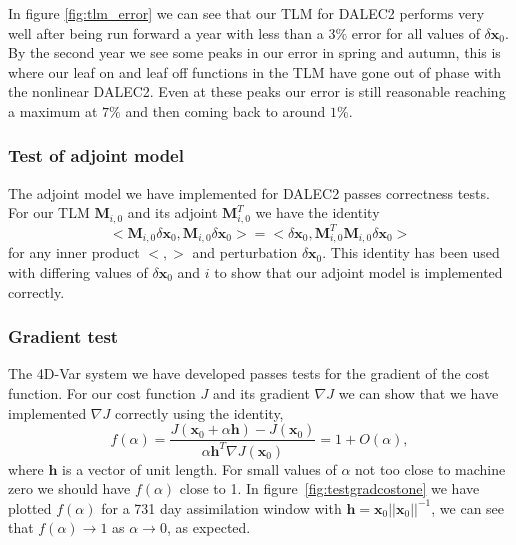 \documentclass[11pt]{article}
\begin{document}
In figure \ref{fig:tlm_error} we can see that our TLM for DALEC2 performs very well after being run forward a year with less than a $3\%$ error for all values of $\delta \textbf{x}_0$. By the second year we see some peaks in our error in spring and autumn, this is where our leaf on and leaf off functions in the TLM have gone out of phase with the nonlinear DALEC2. Even at these peaks our error is still reasonable reaching a maximum at $7\%$ and then coming back to around $1\%$. 

\subsubsection{Test of adjoint model} 

The adjoint model we have implemented for DALEC2 passes correctness tests. For our TLM $\mathbf{M}_{i,0}$ and its adjoint $\mathbf{M}_{i,0}^{T}$ we have the identity
\begin{equation}
<\mathbf{M}_{i,0}\delta\textbf{x}_0, \mathbf{M}_{i,0}\delta\textbf{x}_0> = <\delta\textbf{x}_0, \mathbf{M}_{i,0}^{T}\mathbf{M}_{i,0}\delta\textbf{x}_0>
\end{equation}
for any inner product $<, >$ and perturbation $\delta \textbf{x}_0$. This identity has been used with differing values of $\delta \textbf{x}_0$ and $i$ to show that our adjoint model is implemented correctly.

\subsubsection{Gradient test} \label{sec:testgrad}

The 4D-Var system we have developed passes tests for the gradient of the cost function. For our cost function $J$ and its gradient $\nabla J$ we can show that we have implemented $\nabla J$ correctly using the identity,
\begin{equation}
f(\alpha)=\frac{J( \textbf{x}_0 + \alpha \textbf{h}) - J(\textbf{x}_0)}{\alpha \textbf{h}^{T} \nabla J(\textbf{x}_0)} = 1 + O(\alpha),
\end{equation}
where $\textbf{h}$ is a vector of unit length. For small values of $\alpha$ not too close to machine zero we should have $f(\alpha)$ close to 1. In figure~\ref{fig:testgradcostone} we have plotted $f(\alpha)$ for a 731 day assimilation window with $\textbf{h}=\textbf{x}_0||\textbf{x}_0||^{-1}$, we can see that $f(\alpha) \rightarrow 1$ as $\alpha \rightarrow 0$, as expected.
\end{document}

